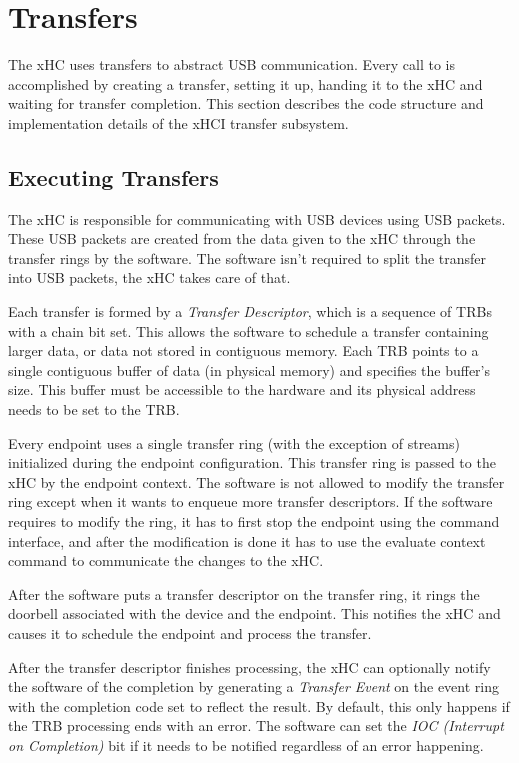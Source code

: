 \section{Transfers}
\label{sec:transfers}

The xHC uses transfers to abstract USB communication. Every call to
 is accomplished by creating a transfer,
setting it up, handing it to the xHC and waiting for transfer completion. This
section describes the code structure and implementation details of the xHCI transfer
subsystem.

\subsection{Executing Transfers}

The xHC is responsible for communicating with USB devices using USB packets.
These USB packets are created from the data given to the xHC through the
transfer rings by the software. The software isn't required to split the
transfer into USB packets, the xHC takes care of that.

Each transfer is formed by a \textit{Transfer Descriptor}, which is a sequence
of TRBs with a chain bit set. This allows the software to schedule a transfer
containing larger data, or data not stored in contiguous memory. Each TRB
points to a single contiguous buffer of data (in physical memory) and specifies
the buffer's size. This buffer must be accessible to the hardware and its
physical address needs to be set to the TRB.

Every endpoint uses a single transfer ring (with the exception of streams)
initialized during the endpoint configuration. This transfer ring is passed to
the xHC by the endpoint context. The software is not allowed to modify the
transfer ring except when it wants to enqueue more transfer descriptors. If the
software requires to modify the ring, it has to first stop the endpoint using
the command interface, and after the modification is done it has to use the
evaluate context command to communicate the changes to the xHC.

After the software puts a transfer descriptor on the transfer ring, it rings
the doorbell associated with the device and the endpoint. This notifies the xHC
and causes it to schedule the endpoint and process the transfer.

After the transfer descriptor finishes processing, the xHC can optionally
notify the software of the completion by generating a \textit{Transfer Event}
on the event ring with the completion code set to reflect the result. By
default, this only happens if the TRB processing ends with an error.
The software can set the \textit{IOC (Interrupt on Completion)} bit if it needs
to be notified regardless of an error happening.

